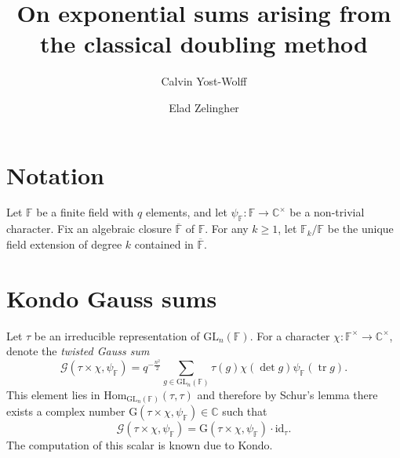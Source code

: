 \documentclass[12pt, reqno]{amsart}
\title{On exponential sums arising from the classical doubling method}
\author{Calvin Yost-Wolff}
\author{Elad Zelingher}
\theoremstyle{definition}
\theoremstyle{definition}
\theoremstyle{definition}
\newcommand{\cComplex}{\mathbb{C}}
\newcommand{\multiplicativegroup}[1]{#1^{\times}}
\newcommand{\Hom}{\mathrm{Hom}}
\newcommand{\idmap}{\mathrm{id}}
\newcommand{\fieldCharacter}{\psi}
\newcommand{\trace}{\operatorname{tr}}
\newcommand{\GL}{\mathrm{GL}}
\newcommand{\finiteField}{\mathbb{F}}
\newcommand{\finiteFieldExtension}[1]{\finiteField_{#1}}
\newcommand{\algebraicClosure}[1]{\overline{#1}}
\newcommand{\GaussSum}[2]{\mathcal{G}\left(#1, #2\right)}
\newcommand{\GaussSumScalar}[2]{\mathrm{G}\left(#1, #2\right)}
\begin{document}
\begin{abstract}
\end{abstract}
\maketitle

\section{Notation}
Let $\finiteField$ be a finite field with $q$ elements, and let $\fieldCharacter_{\finiteField} \colon \finiteField \to \multiplicativegroup{\cComplex}$ be a non-trivial character. Fix an algebraic closure $\algebraicClosure{\finiteField}$ of $\finiteField$. For any $k \ge 1$, let $\finiteFieldExtension{k} \slash \finiteField$ be the unique field extension of degree $k$ contained in $\algebraicClosure{\finiteField}$.

\section{Kondo Gauss sums}
Let $\tau$ be an irreducible representation of $\GL_n\left(\finiteField\right)$. 
For a character $\chi \colon \multiplicativegroup{\finiteField} \to \multiplicativegroup{\cComplex}$, denote the \emph{twisted Gauss sum}
$$\GaussSum{\tau \times \chi}{\fieldCharacter_{\finiteField}} = q^{-\frac{n^2}{2}} \sum_{g \in \GL_n\left(\finiteField\right)} \tau\left(g\right) \chi\left(\det g\right) \fieldCharacter_{\finiteField}\left(\trace g\right).$$
This element lies in $\Hom_{\GL_n\left(\finiteField\right)}\left(\tau, \tau\right)$ and therefore by Schur's lemma there exists a complex number $\GaussSumScalar{\tau \times \chi}{\fieldCharacter_{\finiteField}} \in \cComplex$ such that
$$\GaussSum{\tau \times \chi}{\fieldCharacter_{\finiteField}} = \GaussSumScalar{\tau \times \chi}{\fieldCharacter_{\finiteField}} \cdot \idmap_\tau.$$ The computation of this scalar is known due to Kondo.
\end{document}
